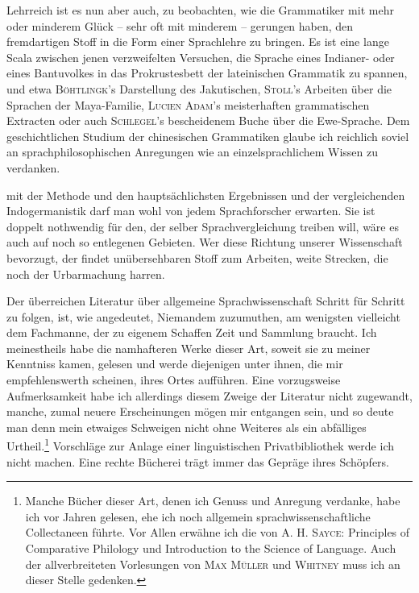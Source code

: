 \label{sp.52}

Lehrreich ist es nun aber auch, zu beobachten, wie die Grammatiker mit mehr oder minderem Glück – sehr oft mit minderem – gerungen haben, den fremdartigen Stoff in die Form einer Sprachlehre zu bringen. Es ist eine lange Scala zwischen jenen verzweifelten Versuchen, die Sprache eines Indianer- oder eines Bantuvolkes in das Prokrustesbett der lateinischen Grammatik zu spannen, und etwa \textsc{Böhtlingk}’s Darstellung des Jakutischen, \textsc{Stoll}’s Arbeiten über die Sprachen der Maya-Familie, \textsc{Lucien Adam}’s meisterhaften grammatischen Extracten oder auch \textsc{Schlegel}’s bescheidenem Buche über die Ewe-Sprache. Dem geschichtlichen Studium der chinesischen Grammatiken glaube ich reichlich soviel an sprachphilosophischen Anregungen wie an einzelsprachlichem Wissen zu verdanken.

\largerpage[1] mit der Methode und den hauptsächlichsten Ergebnissen und  der vergleichenden Indogermanistik darf man wohl von jedem Sprachforscher erwarten. Sie ist doppelt nothwendig für den, der selber Sprachvergleichung treiben will, wäre es auch auf noch so entlegenen Gebieten. Wer diese Richtung unserer Wissenschaft bevorzugt, der findet unübersehbaren Stoff zum Arbeiten, weite Strecken, die noch der Urbarmachung harren.

\begin{sloppypar}Der überreichen Literatur über allgemeine Sprachwissenschaft Schritt für Schritt zu folgen, ist, wie angedeutet, Niemandem zuzumuthen, am wenigsten vielleicht dem Fachmanne, der zu eigenem Schaffen Zeit und Sammlung braucht. Ich meinestheils habe die namhafteren Werke dieser Art, soweit sie zu meiner Kenntniss kamen, gelesen und werde diejenigen unter ihnen, die mir empfehlenswerth scheinen, ihres Ortes aufführen. Eine vorzugsweise Aufmerksamkeit habe ich allerdings diesem Zweige der Literatur nicht zugewandt, manche, zumal neuere Erscheinungen mögen mir entgangen sein, und so deute man denn mein etwaiges \label{fp.53} Schweigen nicht ohne Weiteres als ein abfälliges Urtheil.\footnote{Manche Bücher dieser Art, denen ich Genuss und Anregung verdanke, habe ich vor Jahren gelesen, ehe ich noch allgemein sprachwissenschaftliche Collectaneen führte. Vor Allen erwähne ich die von \textsc{A. H. Sayce}: Principles of Comparative Philology und Introduction to the Science of Language. Auch der allverbreiteten Vorlesungen von \textsc{Max Müller} und \textsc{Whitney} muss ich an dieser Stelle gedenken. } Vorschläge zur Anlage einer linguistischen Privatbibliothek werde ich nicht machen. Eine rechte Bücherei trägt immer das Gepräge ihres Schöpfers.\end{sloppypar}

